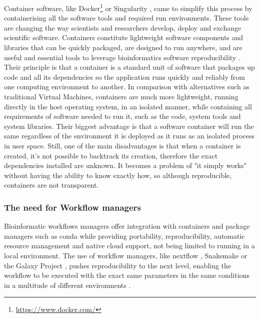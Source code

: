 Container software, like Docker\footnote{\url{https://www.docker.com/}} or Singularity \citep{kurtzer_singularity_2017}, came to simplify this process by containerising all the software tools and required run environments. These tools are changing the way scientists and researchers develop, deploy and exchange scientific software. Containers constitute lightweight software components and libraries that can be quickly packaged, are designed to run anywhere, and are useful and essential tools to leverage bioinformatics software reproducibility \citep{boettiger_introduction_2015,gruening_recommendations_2019}. Their principle is that a container is a standard unit of software that packages up code and all its dependencies so the application runs quickly and reliably from one computing environment to another. In comparison with alternatives such as traditional Virtual Machines, containers are much more lightweight, running directly in the host operating system, in an isolated manner, while containing all requirements of software needed to run it, such as the code, system tools and system libraries. Their biggest advantage is that a software container will run the same regardless of the environment it is deployed as it runs as an isolated process in user space. Still, one of the main disadvantages is that when a container is created, it's not possible to backtrack its creation, therefore the exact dependencies installed are unknown. It becomes a problem of "it simply works" without having the ability to know exactly how, so although reproducible, containers are not transparent. 

\subsubsection{The need for Workflow managers}

Bioinformatic workflows managers offer integration with containers and package managers such as conda while providing portability, reproducibility, automatic resource management and native cloud support, not being limited to running in a local environment. 
The use of workflow managers, like nextflow \citep{di_tommaso_nextflow_2017}, Snakemake or the Galaxy Project \citep{afgan_galaxy_2018}, pushes reproducibility to the next level, enabling the workflow to be executed with the exact same parameters in the same conditions in a multitude of different environments \citep{wratten_reproducible_2021}. 


